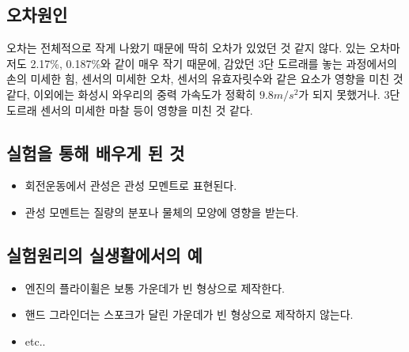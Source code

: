 \documentclass[12pt,a4paper]{article}
\begin{document}
\subsection{오차원인}
오차는 전체적으로 작게 나왔기 때문에 딱히 오차가 있었던 것 같지 않다.
있는 오차마저도 2.17\%, 0.187\%와 같이 매우 작기 때문에, 감았던 3단 도르래를 놓는
과정에서의 손의 미세한 힘, 센서의 미세한 오차, 센서의 유효자릿수와 같은 요소가 영향을
미친 것 같다, 이외에는 화성시 와우리의 중력 가속도가 정확히 $9.8m/s^2$가 되지
못했거나. 3단 도르래 센서의 미세한 마찰 등이 영향을 미친 것 같다.
\subsection{실험을 통해 배우게 된 것}
\begin{itemize}
    \item 회전운동에서 관성은 관성 모멘트로 표현된다.
    \item 관성 모멘트는 질량의 분포나 물체의 모양에 영향을 받는다.
\end{itemize}
\subsection{실험원리의 실생활에서의 예}
\begin{itemize}
    \item 엔진의 플라이휠은 보통 가운데가 빈 형상으로 제작한다.
    \item 핸드 그라인더는 스포크가 달린 가운데가 빈 형상으로 제작하지 않는다.
    \item etc..
\end{itemize}
\end{document}
